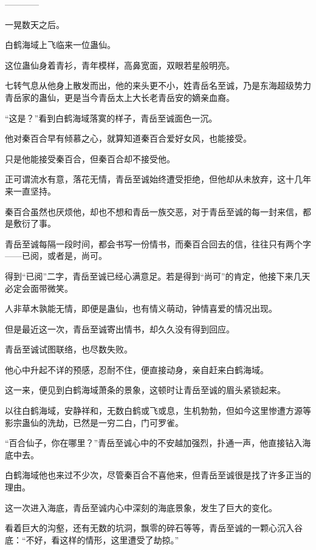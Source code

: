 
\begin{this_body}

------------

一晃数天之后。

白鹤海域上飞临来一位蛊仙。

这位蛊仙身着青衫，青年模样，高鼻宽面，双眼若星般明亮。

七转气息从他身上散发而出，他的来头更不小，姓青岳名至诚，乃是东海超级势力青岳家的蛊仙，更是当今青岳太上大长老青岳安的嫡亲血裔。

“这是？”看到白鹤海域落寞的样子，青岳至诚面色一沉。

他对秦百合早有倾慕之心，就算知道秦百合爱好女风，也能接受。

只是他能接受秦百合，但秦百合却不接受他。

正可谓流水有意，落花无情，青岳至诚始终遭受拒绝，但他却从未放弃，这十几年来一直坚持。

秦百合虽然也厌烦他，却也不想和青岳一族交恶，对于青岳至诚的每一封来信，都是敷衍了事。

青岳至诚每隔一段时间，都会书写一份情书，而秦百合回去的信，往往只有两个字——已阅，或者是，尚可。

得到“已阅”二字，青岳至诚已经心满意足。若是得到“尚可”的肯定，他接下来几天必定会面带微笑。

人非草木孰能无情，即便是蛊仙，也有情义萌动，钟情喜爱的情况出现。

但是最近这一次，青岳至诚寄出情书，却久久没有得到回应。

青岳至诚试图联络，也尽数失败。

他心中升起不详的预感，忍耐不住，便直接动身，亲自赶来白鹤海域。

这一来，便见到白鹤海域萧条的景象，这顿时让青岳至诚的眉头紧锁起来。

以往白鹤海域，安静祥和，无数白鹤或飞或息，生机勃勃，但如今这里惨遭方源等影宗蛊仙的洗劫，已然是一穷二白，门可罗雀。

“百合仙子，你在哪里？”青岳至诚心中的不安越加强烈，扑通一声，他直接钻入海底中去。

白鹤海域他也来过不少次，尽管秦百合不喜他来，但青岳至诚很是找了许多正当的理由。

这一次进入海底，青岳至诚内心中深刻的海底景象，发生了巨大的变化。

看着巨大的沟壑，还有无数的坑洞，飘零的碎石等等，青岳至诚的一颗心沉入谷底：“不好，看这样的情形，这里遭受了劫掠。”


\end{this_body}
